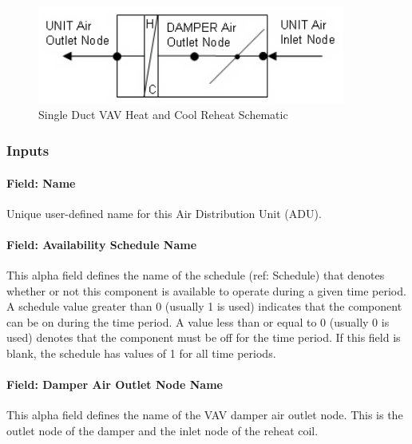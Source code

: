\begin{figure}[hbtp] %
\centering
\includegraphics[width=0.9\textwidth, height=0.9\textheight, keepaspectratio=true]{media/image267.png}
\caption{Single Duct VAV Heat and Cool Reheat Schematic \protect \label{fig:single-duct-vav-heat-and-cool-reheat}}
\end{figure}

\subsubsection{Inputs}\label{inputs-4-000}

\paragraph{Field: Name}\label{field-name-4-000}

Unique user-defined name for this Air Distribution Unit (ADU).

\paragraph{Field: Availability Schedule Name}\label{field-availability-schedule-name-4}

This alpha field defines the name of the schedule (ref: Schedule) that denotes whether or not this component is available to operate during a given time period. A schedule value greater than 0 (usually 1 is used) indicates that the component can be on during the time period. A value less than or equal to 0 (usually 0 is used) denotes that the component must be off for the time period. If this field is blank, the schedule has values of 1 for all time periods.

\paragraph{Field: Damper Air Outlet Node Name}\label{field-damper-air-outlet-node-name-1}

This alpha field defines the name of the VAV damper air outlet node. This is the outlet node of the damper and the inlet node of the reheat coil.

